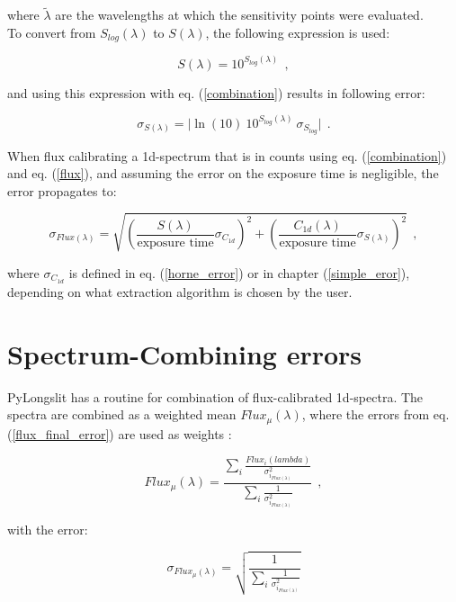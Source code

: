 \documentclass{article}
\begin{document}
\noindent where $\tilde{\lambda}$ are the wavelengths at which the sensitivity points were evaluated.\\

\noindent To convert from $S_{log}(\lambda)$ to $S(\lambda)$, the following expression is used:

\begin{equation}
    S(\lambda) = 10^{S_{log}(\lambda)} \ \ ,
\end{equation}

\noindent and using this expression with eq. (\ref{combination}) results in following error:

\begin{equation}
    \sigma_{S(\lambda)} = \lvert \ln{(10)} \ 10^{S_{log}(\lambda)} \ \sigma_{S_{log}} \rvert \ \ . 
\end{equation}

\noindent When flux calibrating a 1d-spectrum that is in counts using eq. (\ref{combination}) and eq. (\ref{flux}), and assuming the error on the exposure time is negligible, the error propagates to:

\begin{equation}\label{flux_final_error}
    \sigma_{Flux(\lambda)} = \sqrt{\left(\frac{S(\lambda)}{\text{exposure time}} \sigma_{C_{1d}}\right)^2 + \left(\frac{C_{1d}(\lambda)}{\text{exposure time}} \sigma_{S(\lambda)}\right)^2} \ \ ,
\end{equation}

\noindent where $\sigma_{C_{1d}}$ is defined in eq. (\ref{horne_error}) or in chapter (\ref{simple_eror}), depending on what extraction algorithm is chosen by the user.


\section{Spectrum-Combining errors}

PyLongslit has a routine for combination of flux-calibrated 1d-spectra. The spectra are combined as a weighted mean $Flux_{\mu}(\lambda)$, where the errors from eq. (\ref{flux_final_error}) are used as weights \cite[p. 54]{barlow1995statistics}: 

\begin{Large}
    

\begin{equation}
    Flux_{\mu}(\lambda) =  \frac{\sum_{i} \frac{Flux_{i}(lambda)}{\sigma_{i_{Flux(\lambda)}}^2}}{\sum_{i} \frac{1}{\sigma_{i_{Flux(\lambda)}}^2}} \ \ , 
\end{equation}


\end{Large}


\noindent with the error:

\begin{Large}

\begin{equation}
\sigma_{Flux_{\mu}(\lambda)} = \sqrt{\frac{1}{\sum_{i} \frac{1}{\sigma_{i_{Flux(\lambda)}}^2}}}
\end{equation}

\end{Large}



\printbibliography
\end{document}
